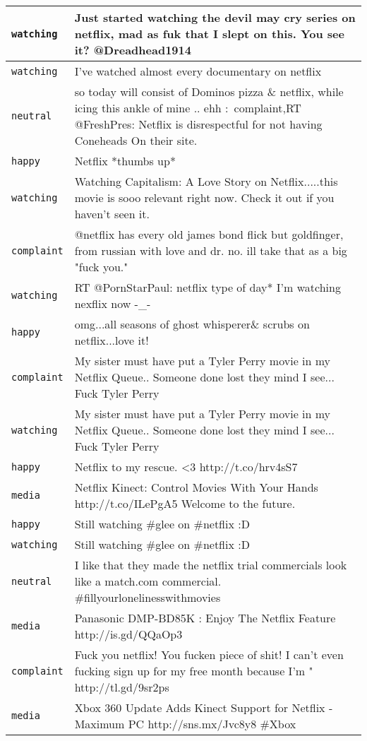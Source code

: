 \begin{center}
\begin{longtable}{|l|p{120mm}|}
         \texttt{watching} & Just started watching the devil may cry series on netflix, mad as fuk that I slept on this. You see it? @Dreadhead1914
      \tabularnewline\hline
         \texttt{watching} & I've watched almost every documentary on netflix
      \tabularnewline\hline
         \texttt{neutral} & so today will consist of Dominos pizza \& netflix, while icing this ankle of mine .. ehh :\ complaint,RT @FreshPres: Netflix is disrespectful for not having Coneheads On their site.
      \tabularnewline\hline
         \texttt{happy} & Netflix *thumbs up*
      \tabularnewline\hline
         \texttt{watching} & Watching Capitalism: A Love Story on Netflix.....this movie is sooo relevant right now. Check it out if you haven't seen it.
      \tabularnewline\hline
         \texttt{complaint} & @netflix has every old james bond flick but goldfinger, from russian with love and dr. no. ill take that as a big "fuck you."
      \tabularnewline\hline
         \texttt{watching} & RT @PornStarPaul: netflix type of day* I'm watching nexflix now -\_-
      \tabularnewline\hline
         \texttt{happy} & omg...all seasons of ghost whisperer\& scrubs on netflix...love it!
      \tabularnewline\hline
         \texttt{complaint} & My sister must have put a Tyler Perry movie in my Netflix Queue.. Someone done lost they mind I see... Fuck Tyler Perry
      \tabularnewline\hline
         \texttt{watching} & My sister must have put a Tyler Perry movie in my Netflix Queue.. Someone done lost they mind I see... Fuck Tyler Perry
      \tabularnewline\hline
         \texttt{happy} & Netflix to my rescue. <3 http://t.co/hrv4sS7
      \tabularnewline\hline
         \texttt{media} & Netflix Kinect: Control Movies With Your Hands http://t.co/ILePgA5 Welcome to the future.
      \tabularnewline\hline
         \texttt{happy} & Still watching \#glee on \#netflix :D
      \tabularnewline\hline
         \texttt{watching} & Still watching \#glee on \#netflix :D
      \tabularnewline\hline
         \texttt{neutral} & I like that they made the netflix trial commercials look like a match.com commercial. \#fillyourlonelinesswithmovies
      \tabularnewline\hline
         \texttt{media} & Panasonic DMP-BD85K : Enjoy The Netflix Feature http://is.gd/QQaOp3
      \tabularnewline\hline
         \texttt{complaint} & Fuck you netflix! You fucken piece of shit! I can't even fucking sign up for my free month because I'm " http://tl.gd/9sr2ps
      \tabularnewline\hline
         \texttt{media} & Xbox 360 Update Adds Kinect Support for Netflix - Maximum PC http://sns.mx/Jvc8y8 \#Xbox
      \tabularnewline\hline

\end{longtable}
\end{center}
